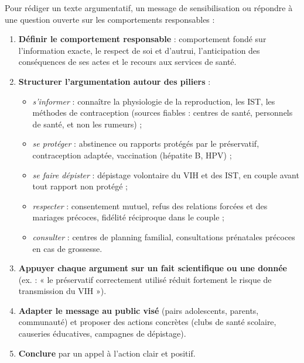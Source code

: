 \documentclass[11pt]{article}
\begin{document}
\begin{methode}
Pour rédiger un texte argumentatif, un message de sensibilisation ou répondre à une question ouverte sur les comportements responsables :
\begin{enumerate}
\item \textbf{Définir le comportement responsable} : comportement fondé sur l'information exacte, le respect de soi et d'autrui, l'anticipation des conséquences de ses actes et le recours aux services de santé.
\item \textbf{Structurer l'argumentation autour des piliers} :
\begin{itemize}
\item \emph{s'informer} : connaître la physiologie de la reproduction, les IST, les méthodes de contraception (sources fiables : centres de santé, personnels de santé, et non les rumeurs) ;
\item \emph{se protéger} : abstinence ou rapports protégés par le préservatif, contraception adaptée, vaccination (hépatite B, HPV) ;
\item \emph{se faire dépister} : dépistage volontaire du VIH et des IST, en couple avant tout rapport non protégé ;
\item \emph{respecter} : consentement mutuel, refus des relations forcées et des mariages précoces, fidélité réciproque dans le couple ;
\item \emph{consulter} : centres de planning familial, consultations prénatales précoces en cas de grossesse.
\end{itemize}
\item \textbf{Appuyer chaque argument sur un fait scientifique ou une donnée} (ex. : « le préservatif correctement utilisé réduit fortement le risque de transmission du VIH »).
\item \textbf{Adapter le message au public visé} (pairs adolescents, parents, communauté) et proposer des actions concrètes (clubs de santé scolaire, causeries éducatives, campagnes de dépistage).
\item \textbf{Conclure} par un appel à l'action clair et positif.
\end{enumerate}
\end{methode}
\end{document}
